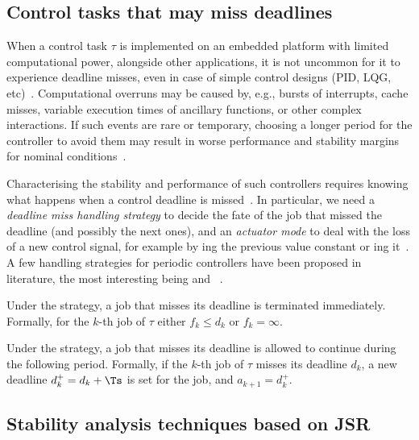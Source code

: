 \subsection{Control tasks that may miss deadlines}
\label{sec:back_deadline_miss}
When a control task $\tau$ is implemented on an embedded platform with limited computational power, alongside other applications, it is not uncommon for it to experience deadline misses, even in case of simple control designs (PID, LQG, etc)~\cite{akesson2020empirical,pazzaglia2021adaptive}.
Computational overruns may be caused by, e.g., bursts of interrupts, cache misses, variable execution times of ancillary functions, or other complex interactions.
If such events are rare or temporary, choosing a longer period for the controller to avoid them may result in worse performance and stability margins for nominal conditions~\cite{Pazzaglia:2019}.

Characterising the stability and performance of such controllers requires knowing what happens when a control deadline is missed~\cite{Pazzaglia:2019,Maggio:2020,Vreman:2021}.
In particular, we need a \emph{deadline miss handling strategy} to decide the fate of the job that missed the deadline (and possibly the next ones), and an \emph{actuator mode} to deal with the loss of a new control signal, for example by \tH{}ing the previous value constant or \tZ{}ing it~\cite{schenato09}.
A few handling strategies for periodic controllers have been proposed in literature, the most interesting being \tK{} and \tS{}~\cite{Cervin:2005,Pazzaglia:2019,Maggio:2020}.

\begin{definition}[\tK{} strategy]%
    \label{def:kill}%
    Under the \tK{} strategy, a job that misses its deadline is terminated immediately. 
    Formally, for the $k$-th job of $\tau$ either $f_k\leq d_k$ or $f_k=\infty$.
\end{definition}

\begin{definition}[\tS{} strategy]%
    \label{def:skip}%
    Under the \tS{} strategy, a job that misses its deadline is allowed to continue during the following period.
    Formally, if the $k$-th job of $\tau$ misses its deadline $d_k$, a new deadline $d^{+}_k = d_k + \Ts$ is set for the job, and $a_{k+1} = d^{+}_k$.
\end{definition}


\subsection{Stability analysis techniques based on JSR}
\label{sec:existing}

